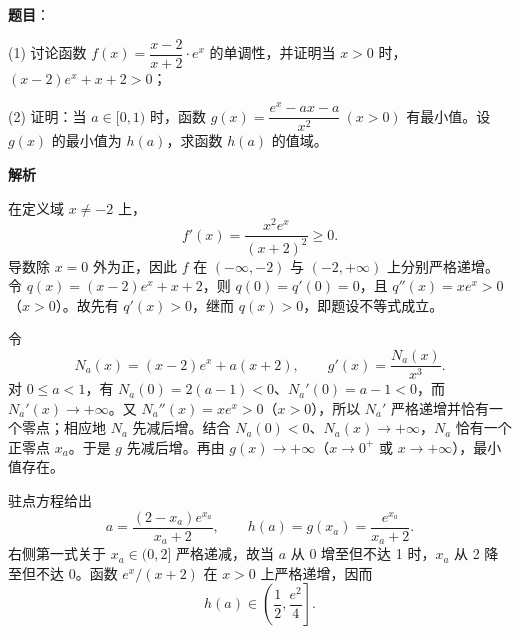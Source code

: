 \begin{answer}

\textbf{题目}：

(1) 讨论函数 \(f(x)=\dfrac{x-2}{x+2}\cdot e^x\) 的单调性，并证明当 \(x>0\) 时，\((x-2)e^x+x+2>0\)；

   (2) 证明：当 \(a\in[0,1)\) 时，函数 \(g(x)=\dfrac{e^x-ax-a}{x^2}\ (x>0)\) 有最小值。设 \(g(x)\) 的最小值为 \(h(a)\)，求函数 \(h(a)\) 的值域。

\textbf{解析}


在定义域 \(x\ne-2\) 上，
\nopagebreak[4]
\[
f'(x)=\frac{x^2e^x}{(x+2)^2}\ge0.
\]
导数除 \(x=0\) 外为正，因此 \(f\) 在 \((-\infty,-2)\) 与 \((-2,+\infty)\) 上分别严格递增。令 \(q(x)=(x-2)e^x+x+2\)，则 \(q(0)=q'(0)=0\)，且 \(q''(x)=xe^x>0\)（\(x>0\)）。故先有 \(q'(x)>0\)，继而 \(q(x)>0\)，即题设不等式成立。


令
\nopagebreak[4]
\[
N_a(x)=(x-2)e^x+a(x+2),\qquad g'(x)=\frac{N_a(x)}{x^3}.
\]
对 \(0\le a<1\)，有 \(N_a(0)=2(a-1)<0\)、\(N_a'(0)=a-1<0\)，而 \(N_a'(x)\to+\infty\)。又 \(N_a''(x)=xe^x>0\)（\(x>0\)），所以 \(N_a'\) 严格递增并恰有一个零点；相应地 \(N_a\) 先减后增。结合 \(N_a(0)<0\)、\(N_a(x)\to+\infty\)，\(N_a\) 恰有一个正零点 \(x_a\)。于是 \(g\) 先减后增。再由 \(g(x)\to+\infty\)（\(x\to0^+\) 或 \(x\to+\infty\)），最小值存在。

驻点方程给出
\nopagebreak[4]
\[
a=\frac{(2-x_a)e^{x_a}}{x_a+2},\qquad h(a)=g(x_a)=\frac{e^{x_a}}{x_a+2}.
\]
右侧第一式关于 \(x_a\in(0,2]\) 严格递减，故当 \(a\) 从 0 增至但不达 1 时，\(x_a\) 从 2 降至但不达 0。函数 \(e^x/(x+2)\) 在 \(x>0\) 上严格递增，因而
\nopagebreak[4]
\[
h(a)\in\left(\frac12,\frac{e^2}{4}\right].
\]


\gkanswer{答案（2）：\(\left(\frac12,\frac{e^2}{4}\right]\)}

\end{answer}
